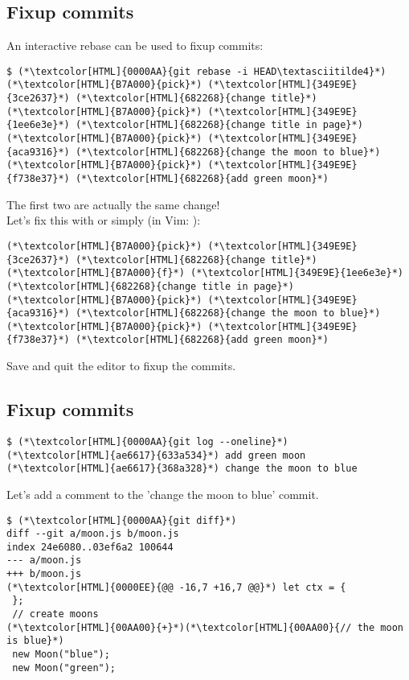 \subsection{Fixup commits}
\begin{frame}[fragile]
  \subslidetitle
  An interactive rebase can be used to fixup commits:
  \begin{lstlisting}
$ (*\textcolor[HTML]{0000AA}{git rebase -i HEAD\textasciitilde4}*)
(*\textcolor[HTML]{B7A000}{pick}*) (*\textcolor[HTML]{349E9E}{3ce2637}*) (*\textcolor[HTML]{682268}{change title}*)
(*\textcolor[HTML]{B7A000}{pick}*) (*\textcolor[HTML]{349E9E}{1ee6e3e}*) (*\textcolor[HTML]{682268}{change title in page}*)
(*\textcolor[HTML]{B7A000}{pick}*) (*\textcolor[HTML]{349E9E}{aca9316}*) (*\textcolor[HTML]{682268}{change the moon to blue}*)
(*\textcolor[HTML]{B7A000}{pick}*) (*\textcolor[HTML]{349E9E}{f738e37}*) (*\textcolor[HTML]{682268}{add green moon}*)
\end{lstlisting}
  The first two are actually the same change!\\

  \vspace{1em}
  Let's fix this with  or simply  (in Vim: ):
  \begin{lstlisting}
(*\textcolor[HTML]{B7A000}{pick}*) (*\textcolor[HTML]{349E9E}{3ce2637}*) (*\textcolor[HTML]{682268}{change title}*)
(*\textcolor[HTML]{B7A000}{f}*) (*\textcolor[HTML]{349E9E}{1ee6e3e}*) (*\textcolor[HTML]{682268}{change title in page}*)
(*\textcolor[HTML]{B7A000}{pick}*) (*\textcolor[HTML]{349E9E}{aca9316}*) (*\textcolor[HTML]{682268}{change the moon to blue}*)
(*\textcolor[HTML]{B7A000}{pick}*) (*\textcolor[HTML]{349E9E}{f738e37}*) (*\textcolor[HTML]{682268}{add green moon}*)
\end{lstlisting}
  Save and quit the editor to fixup the commits.
\end{frame}


\subsection{Fixup commits}
\begin{frame}[fragile]
  \subslidetitle
    \begin{lstlisting}
$ (*\textcolor[HTML]{0000AA}{git log --oneline}*)
(*\textcolor[HTML]{ae6617}{633a534}*) add green moon
(*\textcolor[HTML]{ae6617}{368a328}*) change the moon to blue
\end{lstlisting}

  Let's add a comment to the 'change the moon to blue' commit.

  \begin{lstlisting}
$ (*\textcolor[HTML]{0000AA}{git diff}*)
diff --git a/moon.js b/moon.js
index 24e6080..03ef6a2 100644
--- a/moon.js
+++ b/moon.js
(*\textcolor[HTML]{0000EE}{@@ -16,7 +16,7 @@}*) let ctx = {
 };
 // create moons
(*\textcolor[HTML]{00AA00}{+}*)(*\textcolor[HTML]{00AA00}{// the moon is blue}*)
 new Moon("blue");
 new Moon("green");

\end{lstlisting}

\end{frame}

